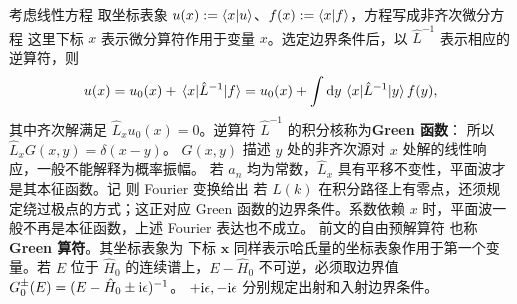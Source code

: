考虑线性方程
取坐标表象 $u(x):=\ip{x}{u}$、$f(x):=\ip{x}{f}$，方程写成非齐次微分方程
这里下标 $x$ 表示微分算符作用于变量 $x$。选定边界条件后，以 $\hat L^{-1}$ 表示相应的逆算符，则
\[
    u(x)=u_0(x)+\mel{x}{\hat L^{-1}}{f}=u_0(x)+\int\dd{y}\mel{x}{\hat L^{-1}}{y}f(y),
\]
其中齐次解满足 $\hat L_xu_0(x)=0$。逆算符 $\hat L^{-1}$ 的积分核称为\textbf{Green 函数}：
所以 $\hat L_xG(x,y)=\delta(x-y)$。
$G(x,y)$ 描述 $y$ 处的非齐次源对 $x$ 处解的线性响应，一般不能解释为概率振幅。
若 $a_n$ 均为常数，$\hat L_x$ 具有平移不变性，平面波才是其本征函数。记
则 Fourier 变换给出
若 $L(k)$ 在积分路径上有零点，还须规定绕过极点的方式；这正对应 Green 函数的边界条件。系数依赖 $x$ 时，平面波一般不再是本征函数，上述 Fourier 表达也不成立。
前文的自由预解算符
也称\textbf{Green 算符}。其坐标表象为
下标 $\bm x$ 同样表示哈氏量的坐标表象作用于第一个变量。若 $E$ 位于 $\hat H_0$ 的连续谱上，$E-\hat H_0$ 不可逆，必须取边界值 $G_0^\pm(E)=(E-\hat H_0\pm\mathrm{i}\epsilon)^{-1}$。
$+\mathrm{i}\epsilon,-\mathrm{i}\epsilon$ 分别规定出射和入射边界条件。


